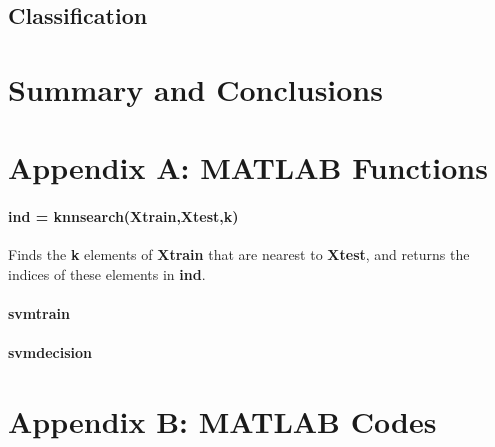 \documentclass[12pt]{article}
\begin{document}
\subsection{Classification}

\section{Summary and Conclusions}

\newpage
\section*{Appendix A: MATLAB Functions}

\paragraph{ind = knnsearch(Xtrain,Xtest,k)} Finds the \textbf{k} elements of \textbf{Xtrain} that are nearest to \textbf{Xtest}, and returns the indices of these elements in \textbf{ind}.

\paragraph{svmtrain}

\paragraph{svmdecision}

\section*{Appendix B: MATLAB Codes}

\end{document}
